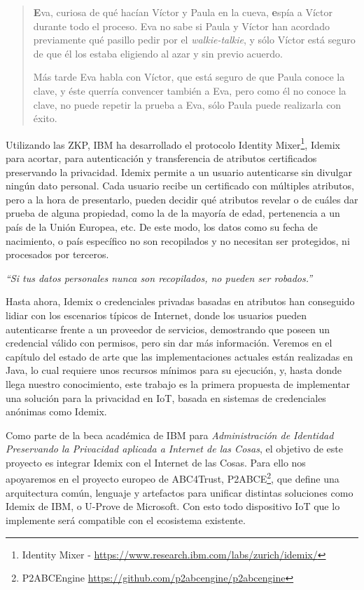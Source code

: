\begin{quote}
	
	\textbf{E}va, curiosa de qué hacían Víctor y Paula en la cueva, \textbf{e}spía a Víctor durante todo el proceso. Eva no sabe si Paula y Víctor han acordado previamente qué pasillo pedir por el \textit{walkie-talkie}, y sólo Víctor está seguro de que él los estaba eligiendo al azar y sin previo acuerdo.%
	
	Más tarde Eva habla con Víctor, que está seguro de que Paula conoce la clave, y éste querría convencer también a Eva, pero como él no conoce la clave, no puede repetir la prueba a Eva, sólo Paula puede realizarla con éxito.
\end{quote}


\hfil

Utilizando las ZKP, IBM ha desarrollado el protocolo Identity Mixer\footnote{Identity Mixer - \url{https://www.research.ibm.com/labs/zurich/idemix/}}, Idemix para acortar, para autenticación y transferencia de atributos certificados preservando la privacidad. Idemix permite a un usuario autenticarse sin divulgar ningún dato personal. Cada usuario recibe un certificado con múltiples atributos, pero a la hora de presentarlo, pueden decidir qué atributos revelar o de cuáles dar prueba de alguna propiedad, como la de la mayoría de edad, pertenencia a un país de la Unión Europea, etc. De este modo, los datos como su fecha de nacimiento, o país específico no son recopilados y no necesitan ser protegidos, ni procesados por terceros.

\begin{center}
	\textit{``Si tus datos personales nunca son recopilados, no pueden ser robados.''}
\end{center}

Hasta ahora, Idemix o credenciales privadas basadas en atributos han conseguido lidiar con los escenarios típicos de Internet, donde los usuarios pueden autenticarse frente a un proveedor de servicios, demostrando que poseen un credencial válido con permisos, pero sin dar más información. Veremos en el capítulo del estado de arte que las implementaciones actuales están realizadas en Java, lo cual requiere unos recursos mínimos para su ejecución, y, hasta donde llega nuestro conocimiento, este trabajo es la primera propuesta de implementar una solución para la privacidad en IoT, basada en sistemas de credenciales anónimas como Idemix.

\hfil

Como parte de la beca académica de IBM para \textit{Administración de Identidad Preservando la Privacidad aplicada a Internet de las Cosas}, el objetivo de este proyecto es integrar Idemix con el Internet de las Cosas. Para ello nos apoyaremos en el proyecto europeo de ABC4Trust, \ac{P2ABCE}\footnote{P2ABCEngine \url{https://github.com/p2abcengine/p2abcengine}}, que define una arquitectura común, lenguaje y artefactos para unificar distintas soluciones como Idemix de IBM, o U-Prove de Microsoft. Con esto todo dispositivo IoT que lo implemente será compatible con el ecosistema existente.

